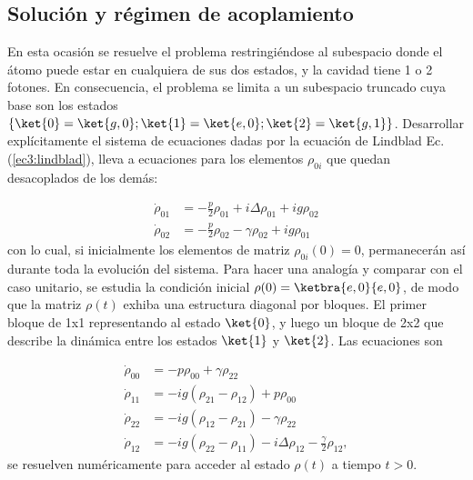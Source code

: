 \subsection{Solución y régimen de acoplamiento}\label{sec3:regimen acoplamiento}
En esta ocasión se resuelve el problema restringiéndose al subespacio donde el átomo puede estar en cualquiera de sus dos estados, y la cavidad tiene 1 o 2 fotones. En consecuencia, el problema se limita a un subespacio truncado cuya base son los estados $\{ \ket{0}=\ket{g,0} ; \ket{1}=\ket{e,0} ; \ket{2}=\ket{g,1} \}$. Desarrollar explícitamente el sistema de ecuaciones dadas por la ecuación de Lindblad Ec. (\ref{ec3:lindblad}), lleva a ecuaciones para los elementos $\rho_{0i}$ que quedan desacoplados de los demás:

\begin{equation}
    \begin{aligned}
        \dot \rho_{01} & =-\frac{p}{2} \rho_{01}+i\Delta\rho_{01}+ig\rho_{02} \\
        \dot \rho_{02} & =-\frac{p}{2} \rho_{02}-\gamma \rho_{02}+ig\rho_{01}
    \end{aligned}
\end{equation}
con lo cual, si inicialmente los elementos de matriz $\rho_{0i}(0)=0$, permanecerán así durante toda la evolución del sistema. Para hacer una analogía y comparar con el caso unitario, se estudia la condición inicial $\rho(0)=\ketbra{e,0}{e,0}$, de modo que la matriz $\rho(t)$ exhiba una estructura diagonal por bloques. El primer bloque de 1x1 representando al estado $\ket{0}$, y luego un bloque de 2x2 que describe la dinámica entre los estados $\ket{1}$ y $\ket{2}$. Las ecuaciones son

\begin{equation}
\begin{aligned}
\dot{\rho}_{00} &= -p \rho_{00} + \gamma \rho_{22} \\
\dot{\rho}_{11} &= -i g (\rho_{21} - \rho_{12}) + p \rho_{00} \\
\dot{\rho}_{22} &= -i g (\rho_{12} - \rho_{21}) - \gamma \rho_{22} \\
\dot{\rho}_{12} &= -i g (\rho_{22} - \rho_{11}) - i \Delta \rho_{12} - \frac{\gamma}{2} \rho_{12},
\end{aligned}
\end{equation}
se resuelven numéricamente para acceder al estado $\rho(t)$ a tiempo $t>0$. 

